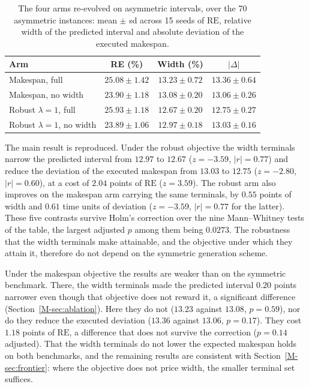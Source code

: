 \documentclass[11pt]{article}
\newcommand{\RE}{\mathrm{RE}}
\begin{document}
\begin{table}[!htb]
\centering\small
\caption{The four arms re-evolved on asymmetric intervals, over the 70
asymmetric instances: mean $\pm$ sd across 15 seeds of $\RE$, relative
width of the predicted interval and absolute deviation of the executed
makespan.}
\label{tab:asym}
\begin{tabular}{lccc}
\toprule
Arm & RE (\%) & Width (\%) & $|\Delta|$ \\
\midrule
Makespan, full & $25.08 \pm 1.42$ & $13.23 \pm 0.72$ & $13.36 \pm 0.64$ \\
Makespan, no width & $23.90 \pm 1.18$ & $13.08 \pm 0.20$ &
$13.06 \pm 0.26$ \\
Robust $\lambda{=}1$, full & $25.93 \pm 1.18$ & $12.67 \pm 0.20$ &
$12.75 \pm 0.27$ \\
Robust $\lambda{=}1$, no width & $23.89 \pm 1.06$ & $12.97 \pm 0.18$ &
$13.03 \pm 0.16$ \\
\bottomrule
\end{tabular}
\end{table}

The main result is reproduced. Under the robust objective the width
terminals narrow the predicted interval from $12.97$ to $12.67$
($z=-3.59$, $|r|=0.77$) and reduce the deviation of the executed
makespan from $13.03$ to $12.75$ ($z=-2.80$, $|r|=0.60$), at a cost of
$2.04$ points of $\RE$ ($z=3.59$). The robust arm also improves on the
makespan arm carrying the same terminals, by $0.55$ points of width and
$0.61$ time units of deviation ($z=-3.59$, $|r|=0.77$ for the
latter). These five contrasts survive Holm's correction over the nine
Mann--Whitney tests of the table, the largest adjusted $p$ among them
being $0.0273$. The robustness that the width terminals make
attainable, and the objective under which they attain it, therefore do
not depend on the symmetric generation scheme.

Under the makespan objective the results are weaker than on the
symmetric benchmark. There, the width terminals made the predicted
interval $0.20$ points narrower even though that objective does not
reward it, a significant difference (Section~\ref{M-sec:ablation}).
Here they do not ($13.23$ against $13.08$, $p=0.59$), nor do they
reduce the executed deviation ($13.36$ against $13.06$, $p=0.17$). They
cost $1.18$ points of $\RE$, a difference that does not survive the
correction ($p=0.14$ adjusted). That the width terminals do not lower
the expected makespan holds on both benchmarks, and the remaining
results are consistent with Section~\ref{M-sec:frontier}: where the
objective does not price width, the smaller terminal set suffices.
\end{document}
